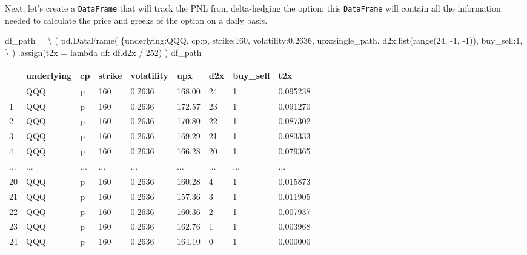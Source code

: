 \documentclass[
  letterpaper,
  DIV=11,
  numbers=noendperiod]{scrreprt}
\newenvironment{Shaded}{\begin{snugshade}}{\end{snugshade}}
\newcommand{\BuiltInTok}[1]{\textcolor[rgb]{0.00,0.23,0.31}{#1}}
\newcommand{\DecValTok}[1]{\textcolor[rgb]{0.68,0.00,0.00}{#1}}
\newcommand{\FloatTok}[1]{\textcolor[rgb]{0.68,0.00,0.00}{#1}}
\newcommand{\KeywordTok}[1]{\textcolor[rgb]{0.00,0.23,0.31}{#1}}
\newcommand{\NormalTok}[1]{\textcolor[rgb]{0.00,0.23,0.31}{#1}}
\newcommand{\OperatorTok}[1]{\textcolor[rgb]{0.37,0.37,0.37}{#1}}
\newcommand{\StringTok}[1]{\textcolor[rgb]{0.13,0.47,0.30}{#1}}
\begin{document}
Next, let's create a \texttt{DataFrame} that will track the PNL from
delta-hedging the option; this \texttt{DataFrame} will contain all the
information needed to calculate the price and greeks of the option on a
daily basis.

\begin{Shaded}
\begin{Highlighting}[]
\NormalTok{df\_path }\OperatorTok{=} \OperatorTok{\textbackslash{}}
\NormalTok{    (}
\NormalTok{    pd.DataFrame(}
\NormalTok{        \{}\StringTok{\textquotesingle{}underlying\textquotesingle{}}\NormalTok{:}\StringTok{\textquotesingle{}QQQ\textquotesingle{}}\NormalTok{,}
         \StringTok{\textquotesingle{}cp\textquotesingle{}}\NormalTok{:}\StringTok{\textquotesingle{}p\textquotesingle{}}\NormalTok{,}
         \StringTok{\textquotesingle{}strike\textquotesingle{}}\NormalTok{:}\DecValTok{160}\NormalTok{,}
         \StringTok{\textquotesingle{}volatility\textquotesingle{}}\NormalTok{:}\FloatTok{0.2636}\NormalTok{,}
         \StringTok{\textquotesingle{}upx\textquotesingle{}}\NormalTok{:single\_path, }
         \StringTok{\textquotesingle{}d2x\textquotesingle{}}\NormalTok{:}\BuiltInTok{list}\NormalTok{(}\BuiltInTok{range}\NormalTok{(}\DecValTok{24}\NormalTok{, }\OperatorTok{{-}}\DecValTok{1}\NormalTok{, }\OperatorTok{{-}}\DecValTok{1}\NormalTok{)),}
         \StringTok{\textquotesingle{}buy\_sell\textquotesingle{}}\NormalTok{:}\DecValTok{1}\NormalTok{,}
\NormalTok{        \}       }
\NormalTok{    )}
\NormalTok{    .assign(t2x }\OperatorTok{=} \KeywordTok{lambda}\NormalTok{ df: df.d2x }\OperatorTok{/} \DecValTok{252}\NormalTok{)}
\NormalTok{    )}
\NormalTok{df\_path}
\end{Highlighting}
\end{Shaded}

\begin{longtable}[]{@{}lllllllll@{}}
\toprule\noalign{}
& underlying & cp & strike & volatility & upx & d2x & buy\_sell & t2x \\
\midrule\noalign{}
\endhead
\bottomrule\noalign{}
\endlastfoot
0 & QQQ & p & 160 & 0.2636 & 168.00 & 24 & 1 & 0.095238 \\
1 & QQQ & p & 160 & 0.2636 & 172.57 & 23 & 1 & 0.091270 \\
2 & QQQ & p & 160 & 0.2636 & 170.80 & 22 & 1 & 0.087302 \\
3 & QQQ & p & 160 & 0.2636 & 169.29 & 21 & 1 & 0.083333 \\
4 & QQQ & p & 160 & 0.2636 & 166.28 & 20 & 1 & 0.079365 \\
... & ... & ... & ... & ... & ... & ... & ... & ... \\
20 & QQQ & p & 160 & 0.2636 & 160.28 & 4 & 1 & 0.015873 \\
21 & QQQ & p & 160 & 0.2636 & 157.36 & 3 & 1 & 0.011905 \\
22 & QQQ & p & 160 & 0.2636 & 160.36 & 2 & 1 & 0.007937 \\
23 & QQQ & p & 160 & 0.2636 & 162.76 & 1 & 1 & 0.003968 \\
24 & QQQ & p & 160 & 0.2636 & 164.10 & 0 & 1 & 0.000000 \\
\end{longtable}
\end{document}
